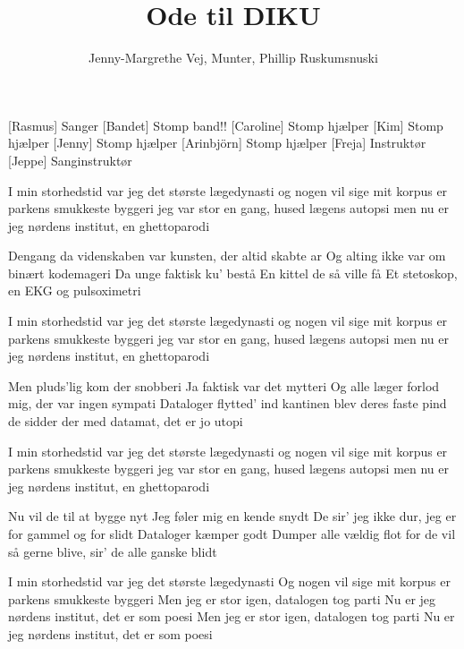 \documentclass[a4paper,11pt]{article}
\title{Ode til DIKU}
\author{Jenny-Margrethe Vej, Munter, Phillip Ruskumsnuski}
\begin{document}
 \maketitle

 \begin{roles}
[Rasmus] Sanger
[Bandet] Stomp band!!
[Caroline] Stomp hjælper
[Kim] Stomp hjælper
[Jenny] Stomp hjælper
[Arinbjörn] Stomp hjælper
[Freja] Instruktør
[Jeppe] Sanginstruktør
 \end{roles}

 \begin{song}
I min storhedstid var jeg det største lægedynasti
og nogen vil sige mit korpus er parkens smukkeste byggeri
jeg var stor en gang, hused lægens autopsi
men nu er jeg nørdens institut, en ghettoparodi

Dengang da videnskaben var
kunsten, der altid skabte ar
Og alting ikke var om binært kodemageri
Da unge faktisk ku' bestå
En kittel de så ville få
Et stetoskop, en EKG og pulsoximetri

I min storhedstid var jeg det største lægedynasti
og nogen vil sige mit korpus er parkens smukkeste byggeri
jeg var stor en gang, hused lægens autopsi
men nu er jeg nørdens institut, en ghettoparodi

Men pluds'lig kom der snobberi
Ja faktisk var det mytteri
Og alle læger forlod mig, der var ingen sympati
Dataloger flytted' ind
kantinen blev deres faste pind
de sidder der med datamat, det er jo utopi

I min storhedstid var jeg det største lægedynasti
og nogen vil sige mit korpus er parkens smukkeste byggeri
jeg var stor en gang, hused lægens autopsi
men nu er jeg nørdens institut, en ghettoparodi

Nu vil de til at bygge nyt
Jeg føler mig en kende snydt
De sir' jeg ikke dur, jeg er for gammel og for slidt
Dataloger kæmper godt
Dumper alle vældig flot
for de vil så gerne blive, sir' de alle ganske blidt

I min storhedstid var jeg det største lægedynasti
Og nogen vil sige mit korpus er parkens smukkeste byggeri
Men jeg er stor igen, datalogen tog parti
Nu er jeg nørdens institut, det er som poesi
Men jeg er stor igen, datalogen tog parti
Nu er jeg nørdens institut, det er som poesi

 \end{song}
\end{document}
